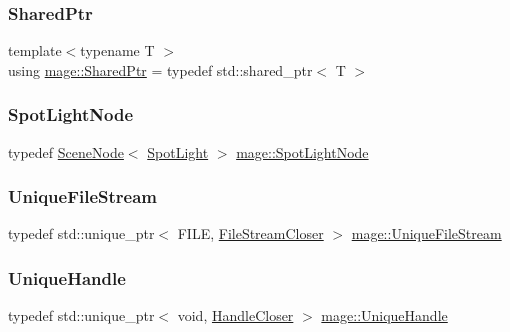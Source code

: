 \hypertarget{namespacemage_a1e01ae66713838a7a67d30e44c67703e}{}\label{namespacemage_a1e01ae66713838a7a67d30e44c67703e} 
\subsubsection{\texorpdfstring{Shared\+Ptr}{SharedPtr}}
{\footnotesize\ttfamily template$<$typename T $>$ \\
using \hyperlink{namespacemage_a1e01ae66713838a7a67d30e44c67703e}{mage\+::\+Shared\+Ptr} = typedef std\+::shared\+\_\+ptr$<$ T $>$}

\hypertarget{namespacemage_ab9f49a82dd438032bb38c5436a657335}{}\label{namespacemage_ab9f49a82dd438032bb38c5436a657335} 
\subsubsection{\texorpdfstring{Spot\+Light\+Node}{SpotLightNode}}
{\footnotesize\ttfamily typedef \hyperlink{classmage_1_1_scene_node}{Scene\+Node}$<$ \hyperlink{classmage_1_1_spot_light}{Spot\+Light} $>$ \hyperlink{namespacemage_ab9f49a82dd438032bb38c5436a657335}{mage\+::\+Spot\+Light\+Node}}

\hypertarget{namespacemage_a679c1b707dee02c7eab8d706ef14411a}{}\label{namespacemage_a679c1b707dee02c7eab8d706ef14411a} 
\subsubsection{\texorpdfstring{Unique\+File\+Stream}{UniqueFileStream}}
{\footnotesize\ttfamily typedef std\+::unique\+\_\+ptr$<$ F\+I\+LE, \hyperlink{structmage_1_1_file_stream_closer}{File\+Stream\+Closer} $>$ \hyperlink{namespacemage_a679c1b707dee02c7eab8d706ef14411a}{mage\+::\+Unique\+File\+Stream}}

\hypertarget{namespacemage_a284e84e551a05d4fc6c957985b2de3ed}{}\label{namespacemage_a284e84e551a05d4fc6c957985b2de3ed} 
\subsubsection{\texorpdfstring{Unique\+Handle}{UniqueHandle}}
{\footnotesize\ttfamily typedef std\+::unique\+\_\+ptr$<$ void, \hyperlink{structmage_1_1_handle_closer}{Handle\+Closer} $>$ \hyperlink{namespacemage_a284e84e551a05d4fc6c957985b2de3ed}{mage\+::\+Unique\+Handle}}

